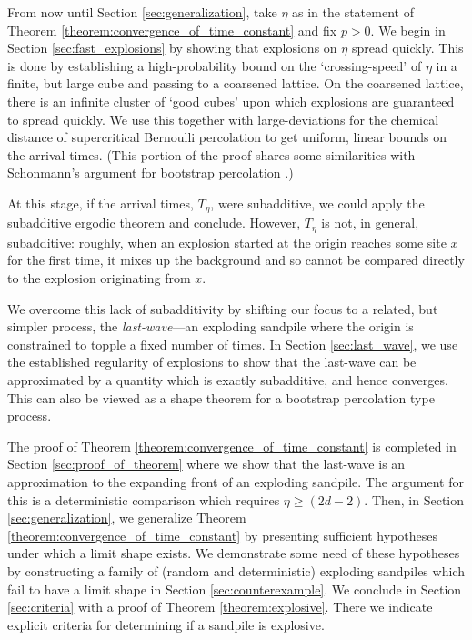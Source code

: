 \documentclass[aap]{imsart}
\begin{document}
From now until Section \ref{sec:generalization}, take $\eta$ as in the statement of Theorem \ref{theorem:convergence_of_time_constant} and fix $p > 0$. We begin in Section \ref{sec:fast_explosions} by showing that explosions on $\eta$ spread quickly. This is done by establishing a high-probability bound on the `crossing-speed' of $\eta$ in a finite, but large cube and passing to a coarsened lattice. On the coarsened lattice, there is an infinite cluster of `good cubes' upon which explosions are guaranteed to spread quickly. We use this together with
large-deviations for the chemical distance of supercritical Bernoulli percolation to get
uniform, linear bounds on the arrival times. (This portion of the proof shares some similarities with 
Schonmann's argument for bootstrap percolation \cite{schonmann1992behavior}.)

At this stage, if the arrival times, $T_{\eta}$, were subadditive, we could apply the subadditive ergodic theorem
and conclude. However, $T_{\eta}$ is not, in general, subadditive: roughly, when an explosion
started at the origin reaches some site $x$ for the first time, it mixes up the background
and so cannot be compared directly to the explosion originating from $x$. 

We overcome this lack of subadditivity by shifting our focus to a related, but simpler process, 
the {\it last-wave}---an exploding sandpile where the origin is constrained to topple a fixed number of times.  In Section \ref{sec:last_wave}, we use the established regularity of explosions to show that the last-wave can be approximated by a quantity which is exactly subadditive, and hence converges. This can also be viewed as a shape theorem for a bootstrap percolation type process. 

The proof of Theorem \ref{theorem:convergence_of_time_constant} is completed in Section \ref{sec:proof_of_theorem} where we show that the last-wave is an approximation to the expanding front of an exploding sandpile. The argument for this is a deterministic comparison which requires $\eta \geq (2d - 2)$. Then, in Section \ref{sec:generalization}, we generalize Theorem \ref{theorem:convergence_of_time_constant} 
by presenting sufficient hypotheses under which a limit shape exists. We demonstrate some need of these hypotheses
by constructing a family of (random and deterministic) exploding sandpiles which fail to have a limit shape in Section \ref{sec:counterexample}. We conclude in Section \ref{sec:criteria} with a proof of Theorem \ref{theorem:explosive}. There we indicate explicit criteria 
for determining if a sandpile is explosive. 
\end{document}

